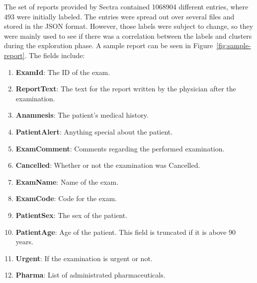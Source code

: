 The set of reports provided by Sectra contained 1068904 different entries, where 493 were initially labeled.
The entries were spread out over several files and stored in the JSON format.
However, those labels were subject to change, so they were mainly used to see if there was a correlation between the labels and clusters during the exploration phase.
A sample report can be seen in Figure~\ref{fig:sample-report}.
The fields include:
\begin{enumerate}
    \item \textbf{ExamId}: The ID of the exam.
    \item \textbf{ReportText}: The text for the report written by the physician after the examination.
    \item \textbf{Anamnesis}: The patient's medical history.
    \item \textbf{PatientAlert}: Anything special about the patient.
    \item \textbf{ExamComment}: Comments regarding the performed examination.
    \item \textbf{Cancelled}: Whether or not the examination was Cancelled.
    \item \textbf{ExamName}: Name of the exam.
    \item \textbf{ExamCode}: Code for the exam.
    \item \textbf{PatientSex}: The sex of the patient.
    \item \textbf{PatientAge}: Age of the patient. This field is truncated if it is above 90 years.
    \item \textbf{Urgent}: If the examination is urgent or not.
    \item \textbf{Pharma}: List of administrated pharmaceuticals.
\end{enumerate}
